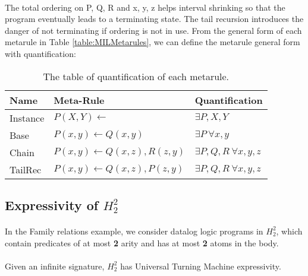 \documentclass{article}
\theoremstyle{plain}
\theoremstyle{definition}
\begin{document}
\begin{multicols}{2}
\paragraph{} The total ordering on P, Q, R and x, y, z helps interval shrinking so that the program eventually leads to a terminating state. The tail recursion introduces the danger of not terminating if ordering is not in use. From the general form of each metarule in Table \ref{table:MILMetarules}, we can define the metarule general form with quantification:

\begin{table}[H]
\centering\footnotesize
\begin{tabular}{ | l | l | l | }
\hline
\textbf{Name} & \textbf{Meta-Rule} & \textbf{Quantification} \\
\hline
\hline

Instance & $P(X, Y) \leftarrow$ & $\exists P, X, Y$\\
\hline

Base & $P(x, y) \leftarrow Q(x, y)$ & $\exists P\ \forall x, y$\\
\hline

Chain & $P(x, y) \leftarrow Q(x, z), R(z, y)$ & $\exists P, Q, R\ \forall x, y, z$\\
\hline

TailRec & $P(x, y) \leftarrow Q(x, z), P(z, y)$ & $\exists P, Q, R\ \forall x, y, z$\\
\hline
\end{tabular}
\caption{The table of quantification of each metarule.}\label{table:MILMetarulesQuantification}
\end{table}

\subsection{Expressivity of $H^2_2$}

\paragraph{} In the Family relations example, we consider datalog logic programs in $H^2_2$, which contain predicates of at most \textbf{2} arity and has at most \textbf{2} atoms in the body.

\paragraph{} Given an infinite signature, $H^2_2$ has Universal Turning Machine expressivity.\cite{tarnlund77}


\end{multicols}
\end{document}
